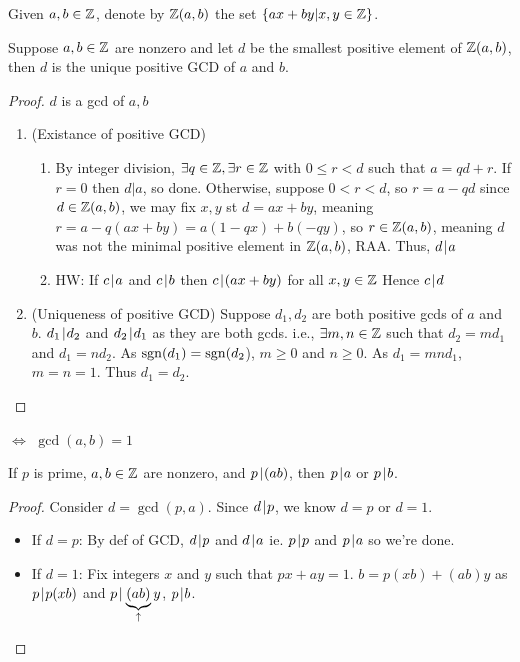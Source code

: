 \documentclass[notes.tex]{subfiles}
\begin{document}

\begin{definition}
	Given $a, b\in\mathbb{Z}$, denote by $\mathbb{Z}(a, b)$ the set $\{ax+by | x,y\in\mathbb{Z}\}$.
\end{definition}

\begin{theorem}
	 Suppose $a, b\in\mathbb{Z}$ are nonzero and let $d$ be the smallest positive element of $\mathbb{Z}(a, b)$, then $d$ is the unique positive GCD of $a$ and $b$.
\end{theorem}
\begin{proof}
	$d$ is a gcd of $a, b$
	\begin{enumerate}
		\item (Existance of positive GCD)
		\begin{enumerate}
			\item By integer division, $\exists q \in \mathbb{Z}, \exists r\in \mathbb{Z}$ with $0\le r < d$ such that $a = qd+r$. If $r=0$ then $d|a$, so done.
			Otherwise, suppose $0 < r < d$, so $r = a-qd$
			since $d\in\mathbb{Z}(a, b)$, we may fix $x, y$ st $d=ax+by$, meaning $r=a-q(ax+by) = a(1-qx) + b(-qy)$, so $r\in \mathbb{Z}(a, b)$, meaning $d$ was not the minimal positive element in $\mathbb{Z}(a, b)$, RAA.
			Thus, $d\mkern2mu|\mkern1mu a$
			\item
			HW: If $c\mkern2mu|\mkern1mu a$ and $c\mkern2mu|\mkern1mu b$ then $c\mkern2mu|\mkern1mu(ax+by)$ for all $x, y\in\mathbb{Z}$ Hence $c\mkern2mu|\mkern1mu d$
		\end{enumerate}
		\item (Uniqueness of positive GCD)
			Suppose $d_1, d_2$ are both positive gcds of $a$ and $b$.
			$d_1\mkern2mu|\mkern1mu d_2$ and $d_2 \mkern2mu|\mkern1mu d_1$ as they are both gcds. i.e., $\exists m, n \in\mathbb{Z}$ such that $d_2=md_1$ and $d_1=nd_2$. As $\operatorname{\mathrm{sgn}}(d_1) = \operatorname{\mathrm{sgn}}(d_2$), $m \ge 0$ and $n \ge 0$. As $d_1 = mn d_1$, $m = n = 1$. Thus $d_1 = d_2$.
	\end{enumerate}
\end{proof}

\begin{definition}
	 $\iff$ $\gcd(a, b) = 1$
\end{definition}

\begin{theorem}
	If $p$ is prime, $a, b\in\mathbb{Z}$ are nonzero, and $p\mkern2mu|\mkern1mu (ab)$, then $p\mkern2mu|\mkern1mu a$ or $p\mkern2mu|\mkern1mu b$.
\end{theorem}

\begin{proof}
	Consider $d = \gcd(p, a)$. Since $d\mkern2mu|\mkern1mu p$, we know $d=p$ or $d = 1$.
	\begin{itemize}
		\item[] If $d=p$: By def of GCD, $d\mkern2mu|\mkern1mu p$ and $d\mkern2mu|\mkern1mu a$ ie. $p\mkern2mu|\mkern1mu p$ and $p \mkern2mu|\mkern1mu a$ so we're done.
		\item[] If $d=1$: Fix integers $x$ and $y$ such that $px+ay=1$. $b=p(xb)+(ab)y$
		as $p\mkern2mu|\mkern1mu p(xb)$ and $p\mkern2mu|\mkern1mu \underbrace{(ab)}_{\uparrow}y$, $p\mkern2mu|\mkern1mu b$.
	\end{itemize}
\end{proof}
\end{document}
